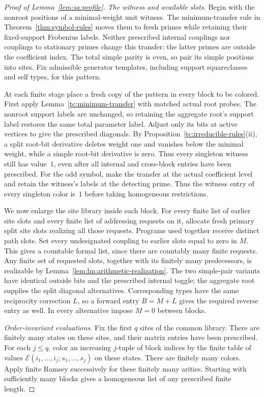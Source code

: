 \begin{proof}[Proof of Lemma~\ref{lem:sa:profile}]
\emph{The witness and available slots.}
Begin with the nonroot positions of a minimal-weight unit witness.
The minimum-transfer rule in Theorem~\ref{thm:symbol-rules} moves them
to fresh primes while retaining their fixed-support Frobenius labels.
Neither prescribed internal couplings nor couplings to stationary
primes change this transfer: the latter primes are outside the
coefficient index.  The total simple parity is even, so pair its
simple positions into sites.  Fix admissible generator templates,
including support squareclasses and self types, for this pattern.

At each finite stage place a fresh copy of the pattern in every block
to be colored. First apply Lemma~\ref{tc:minimum-transfer} with
matched actual root probes. The nonroot support labels are unchanged,
so retaining the aggregate root's support label restores the same total
parameter label. Adjust only its bits at active vertices to give the
prescribed diagonals. By Proposition~\ref{tc:irreducible-rules}\textup{(ii)}, a split
root-bit derivative deletes weight one and vanishes below the minimal
weight, while a simple root-bit derivative is zero. Thus every singleton
witness still has value~$1$, even after all internal and cross-block
entries have been prescribed.  For the odd symbol, make the transfer
at the actual coefficient level and retain the witness's labels at
the detecting prime.  Thus the witness entry of every singleton color
is~$1$ before taking homogeneous restrictions.

We now enlarge the site library inside each block.  For every finite list of earlier
site slots and every finite list of addressing requests on it, allocate
fresh primary split site slots realizing all those requests.  Programs
used together receive distinct path slots.  Set every undesignated
coupling to earlier slots equal to zero in $M$.  This gives a
countable formal list, since there are countably many finite requests.
Any finite set of requested slots, together with its finitely many
predecessors, is realizable by
Lemma~\ref{lem:lm:arithmetic-realization}.
The two simple-pair variants have identical outside bits and the
prescribed internal toggle; the aggregate root supplies the split
diagonal alternatives.  Corresponding types have the same reciprocity
correction $L$, so a forward entry $B=M+L$ gives the required reverse
entry as well.  In every alternative impose $M=0$ between blocks.

\emph{Order-invariant evaluations.}
Fix the first $q$ sites of the common library. There are finitely many
states on these sites, and their matrix entries have been prescribed.
For each $j\le q$, color an increasing $j$-tuple of block indices by
the finite table of values
$\mathcal E(i_1,\ldots,i_j;s_1,\ldots,s_j)$ on these states.  There are finitely
many colors.  Apply finite Ramsey successively for these finitely
many arities.  Starting with sufficiently many blocks gives a
homogeneous list of any prescribed finite length.


\end{proof}
